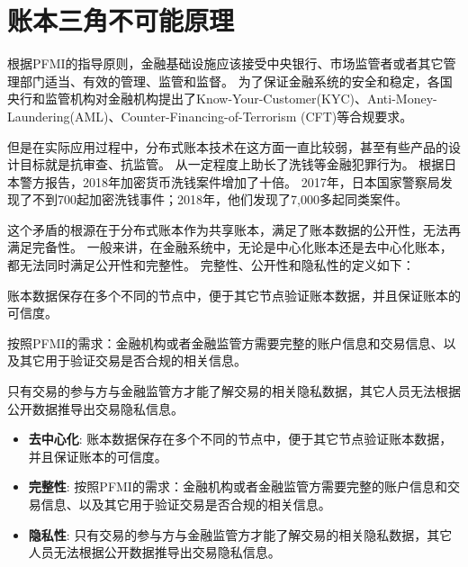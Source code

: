 \section{账本三角不可能原理}\label{sec:triangle}
根据PFMI的指导原则，金融基础设施应该接受中央银行、市场监管者或者其它管理部门适当、有效的管理、监管和监督。
为了保证金融系统的安全和稳定，各国央行和监管机构对金融机构提出了Know-Your-Customer(KYC)、Anti-Money-Laundering(AML)、Counter-Financing-of-Terrorism (CFT)等合规要求。

但是在实际应用过程中，分布式账本技术在这方面一直比较弱，甚至有些产品的设计目标就是抗审查、抗监管。
从一定程度上助长了洗钱等金融犯罪行为。
根据日本警方报告\cite{jp_report}，2018年加密货币洗钱案件增加了十倍。
2017年，日本国家警察局发现了不到700起加密洗钱事件；2018年，他们发现了7,000多起同类案件。


这个矛盾的根源在于分布式账本作为共享账本，满足了账本数据的公开性，无法再满足完备性。
一般来讲，在金融系统中，无论是中心化账本还是去中心化账本，都无法同时满足公开性和完整性。
完整性、公开性和隐私性的定义如下：

\begin{definition}[去中心化]
    账本数据保存在多个不同的节点中，便于其它节点验证账本数据，并且保证账本的可信度。
\end{definition}

\begin{definition}[完整性]
    按照PFMI的需求：金融机构或者金融监管方需要完整的账户信息和交易信息、以及其它用于验证交易是否合规的相关信息。
\end{definition}

\begin{definition}[隐私性]
    只有交易的参与方与金融监管方才能了解交易的相关隐私数据，其它人员无法根据公开数据推导出交易隐私信息。
\end{definition}

\begin{itemize}
    \item[\dag] \textbf{去中心化}:
    账本数据保存在多个不同的节点中，便于其它节点验证账本数据，并且保证账本的可信度。

    \item[\dag] \textbf{完整性}:
    按照PFMI的需求：金融机构或者金融监管方需要完整的账户信息和交易信息、以及其它用于验证交易是否合规的相关信息。
    
    \item[\dag] \textbf{隐私性}:
    只有交易的参与方与金融监管方才能了解交易的相关隐私数据，其它人员无法根据公开数据推导出交易隐私信息。

\end{itemize}

